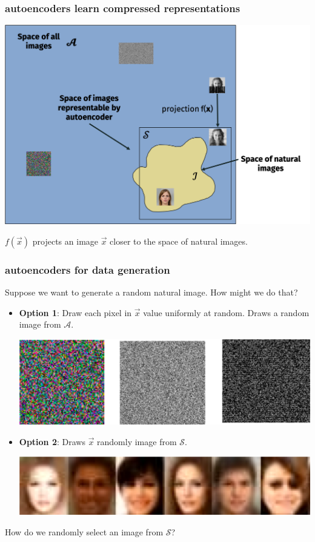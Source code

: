 \documentclass[handout,compress]{beamer}
\begin{document}
\begin{frame}
	\frametitle{autoencoders learn compressed representations}
	\begin{center}
		\includegraphics[width=.8\textwidth]{autoencoder_cartoon.png}
	\end{center}
	$f(\vec{x})$ projects an image $\vec{x}$ closer to the space of natural images.
\end{frame}

\begin{frame}
	\frametitle{autoencoders for data generation}
	Suppose we want to generate a random natural image. How might we do that?
	

	\begin{itemize}
		\item \textbf{Option 1}: Draw each pixel in $\vec{x}$ value uniformly at random. Draws a random image from $\mathcal{A}$.
			\begin{center}
		\includegraphics[width=.3\textwidth]{noise.png}
			\end{center}
		
		\item \textbf{Option 2}: Draws $\vec{x}$ randomly image from $\mathcal{S}$. 
				\begin{center}
		\includegraphics[width=.3\textwidth]{faces.png}
			\end{center}
	\end{itemize}

How do we randomly select an image from $\mathcal{S}$? 
\end{frame}
\end{document}
